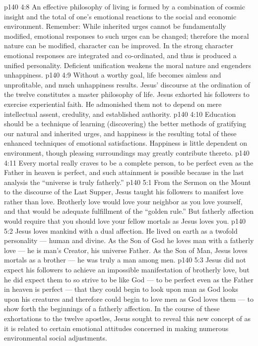 \vs p140 4:8 \pc An effective philosophy of living is formed by a combination of cosmic insight and the total of one’s emotional reactions to the social and economic environment. Remember: While inherited urges cannot be fundamentally modified, emotional responses to such urges can be changed; therefore the moral nature can be modified, character can be improved. In the strong character emotional responses are integrated and co\hyp{}ordinated, and thus is produced a unified personality. Deficient unification weakens the moral nature and engenders unhappiness.
\vs p140 4:9 Without a worthy goal, life becomes aimless and unprofitable, and much unhappiness results. Jesus’ discourse at the ordination of the twelve constitutes a master philosophy of life. Jesus exhorted his followers to exercise experiential faith. He admonished them not to depend on mere intellectual assent, credulity, and established authority.
\vs p140 4:10 Education should be a technique of learning (discovering) the better methods of gratifying our natural and inherited urges, and happiness is the resulting total of these enhanced techniques of emotional satisfactions. Happiness is little dependent on environment, though pleasing surroundings may greatly contribute thereto.
\vs p140 4:11 \pc Every mortal really craves to be a complete person, to be perfect even as the Father in heaven is perfect, and such attainment is possible because in the last analysis the “universe is truly fatherly.”
\vs p140 5:1 From the Sermon on the Mount to the discourse of the Last Supper, Jesus taught his followers to manifest  love rather than  love. Brotherly love would love your neighbor as you love yourself, and that would be adequate fulfillment of the “golden rule.” But fatherly affection would require that you should love your fellow mortals as Jesus loves you.
\vs p140 5:2 Jesus loves mankind with a dual affection. He lived on earth as a twofold personality --- human and divine. As the Son of God he loves man with a fatherly love --- he is man’s Creator, his universe Father. As the Son of Man, Jesus loves mortals as a brother --- he was truly a man among men.
\vs p140 5:3 Jesus did not expect his followers to achieve an impossible manifestation of brotherly love, but he did expect them to so strive to be like God --- to be perfect even as the Father in heaven is perfect --- that they could begin to look upon man as God looks upon his creatures and therefore could begin to love men as God loves them --- to show forth the beginnings of a fatherly affection. In the course of these exhortations to the twelve apostles, Jesus sought to reveal this new concept of  as it is related to certain emotional attitudes concerned in making numerous environmental social adjustments.
